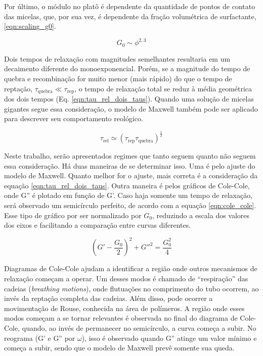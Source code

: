 		Por último, o módulo no platô é dependente da quantidade de pontos de contato das micelas, que, por sua vez, é dependente da fração volumétrica de surfactante, \ref{eqn:scaling_g0}.
		
		\begin{equation}
			G_0 \sim \phi^{2{,}3}  
			\label{eqn:scaling_g0}
		\end{equation} %
		
		Dois tempos de relaxação com magnitudes semelhantes resultaria em um decaimento diferente do monoexponencial. Porém, se a magnitude do tempo de quebra e recombinação for muito menor (mais rápido) do que o tempo de reptação, \( \tau_{\mathrm{quebra}} \ll \tau_\mathrm{rep} \), o tempo de relaxação total se reduz à média geométrica dos dois tempos (Eq. \ref{eqn:tau_rel_dois_taus}). Quando uma solução de micelas gigantes segue essa consideração, o modelo de Maxwell também pode ser aplicado para descrever seu comportamento reológico.  %
		
		\begin{equation}
			\tau_{\mathrm{rel}} \simeq \left( \tau_\mathrm{rep} \tau_\mathrm{quebra} \right) ^ \frac{1}{2}
			\label{eqn:tau_rel_dois_taus}
		\end{equation}
		
		Neste trabalho, serão apresentados regimes que tanto seguem quanto não seguem essa consideração. Há duas maneiras de se determinar isso. Uma é pelo ajuste do modelo de Maxwell. %
		 Quanto melhor for o ajuste, mais correta é a consideração da equação \ref{eqn:tau_rel_dois_taus}. Outra maneira é pelos gráficos de Cole-Cole, onde G'' é plotado em função de G'. Caso haja somente um tempo de relaxação, será observado um semicírculo perfeito, de acordo com a equação \ref{eqn:cole_cole}. Esse tipo de gráfico por ser normalizado por \(G_0\), reduzindo a escala dos valores dos eixos e facilitando a comparação entre curvas diferentes.
		
		\begin{equation}
			\left(G' - \frac{G_0}{2}\right)^2 + G''^2 = \frac{G_0^2}{4}
			\label{eqn:cole_cole}
		\end{equation}

		
		Diagramas de Cole-Cole ajudam a identificar a região onde outros mecanismos de relaxação começam a operar. Um desses modos é chamado de ``respiração'' das cadeias (\emph{breathing motions}), onde flutuações no comprimento do tubo ocorrem, ao invés da reptação completa das cadeias. Além disso, pode ocorrer a movimentação de Rouse, conhecida na área de polímeros. %
		A região onde esses modos começam a se tornar relevantes é observada no final do diagrama de Cole-Cole, quando, ao invés de permanecer no semicírculo, a curva começa a subir. No reograma (G' e G'' por \(\omega\)), isso é observado quando G'' atinge um valor mínimo e começa a subir, sendo que o modelo de Maxwell prevê somente sua queda.
		
